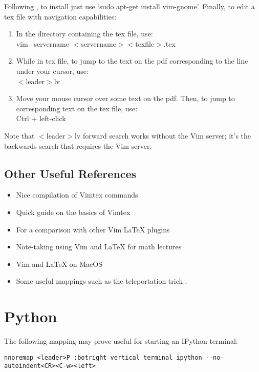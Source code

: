 \documentclass[10pt]{article}
\newcommand{\tlangle}{$<$}
\newcommand{\trangle}{$>$}
\begin{document}
Following \cite{lerner2004enable}, to install just use `sudo apt-get install vim-gnome'. Finally, to edit a tex file
with navigation capabilities:
\begin{enumerate}
    \item In the directory containing the tex file, use:\\
        vim --servername \tlangle servername\trangle \tlangle texfile\trangle.tex
    \item While in tex file, to jump to the text on the pdf corresponding to the line under your cursor, use:\\
        \tlangle leader\trangle lv
    \item Move your mouse cursor over some text on the pdf. Then, to jump to corresponding text on the tex file, use:\\
        Ctrl + left-click
\end{enumerate}
Note that \tlangle leader\trangle lv forward search works without the Vim server; it's the backwards search that requires the Vim server.

\subsection{Other Useful References}
\begin{itemize}
    \item Nice compilation of Vimtex commands \cite{gunther2014vimtex}
    \item Quick guide on the basics of Vimtex \cite{jdhao2019complete}
    \item For a comparison with other Vim LaTeX plugins \cite{lervag2015vim}
    \item Note-taking using Vim and LaTeX for math lectures \cite{castel2019how}
    \item Vim and LaTeX on MacOS \cite{dyke2020getting}
    \item Some useful mappings such as the teleportation trick \cite{smith2016my, smith2017start}. 
\end{itemize}

\section{Python}
The following mapping may prove useful for starting an IPython terminal:\\ 
\begin{lstlisting}
nnoremap <leader>P :botright vertical terminal ipython --no-autoindent<CR><C-w><left>
\end{lstlisting}
\end{document}
